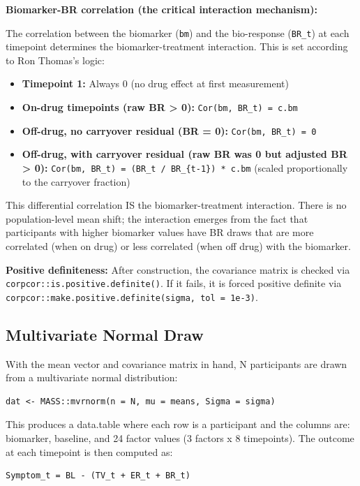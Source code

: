 \documentclass[11pt]{article}
\begin{document}
\textbf{Biomarker-BR correlation (the critical interaction mechanism):}

The correlation between the biomarker (\texttt{bm}) and the bio-response
(\texttt{BR\_t}) at each timepoint determines the biomarker-treatment
interaction. This is set according to Ron Thomas's logic:

\begin{itemize}
  \item \textbf{Timepoint 1:} Always 0 (no drug effect at first measurement)
  \item \textbf{On-drug timepoints (raw BR > 0):} \texttt{Cor(bm, BR\_t) = c.bm}
  \item \textbf{Off-drug, no carryover residual (BR = 0):} \texttt{Cor(bm, BR\_t) = 0}
  \item \textbf{Off-drug, with carryover residual (raw BR was 0 but adjusted
    BR > 0):} \texttt{Cor(bm, BR\_t) = (BR\_t / BR\_\{t-1\}) * c.bm}
    (scaled proportionally to the carryover fraction)
\end{itemize}

This differential correlation IS the biomarker-treatment
interaction. There is no population-level mean shift; the
interaction emerges from the fact that participants with higher
biomarker values have BR draws that are more correlated (when on
drug) or less correlated (when off drug) with the biomarker.

\textbf{Positive definiteness:} After construction, the covariance
matrix is checked via \texttt{corpcor::is.positive.definite()}. If it
fails, it is forced positive definite via
\texttt{corpcor::make.positive.definite(sigma, tol = 1e-3)}.

\subsection{Multivariate Normal Draw}

With the mean vector and covariance matrix in hand, N
participants are drawn from a multivariate normal distribution:

\begin{lstlisting}
dat <- MASS::mvrnorm(n = N, mu = means, Sigma = sigma)
\end{lstlisting}

This produces a data.table where each row is a participant and
the columns are: biomarker, baseline, and 24 factor values
(3 factors x 8 timepoints). The outcome at each timepoint is
then computed as:

\begin{verbatim}
Symptom_t = BL - (TV_t + ER_t + BR_t)
\end{verbatim}
\end{document}
